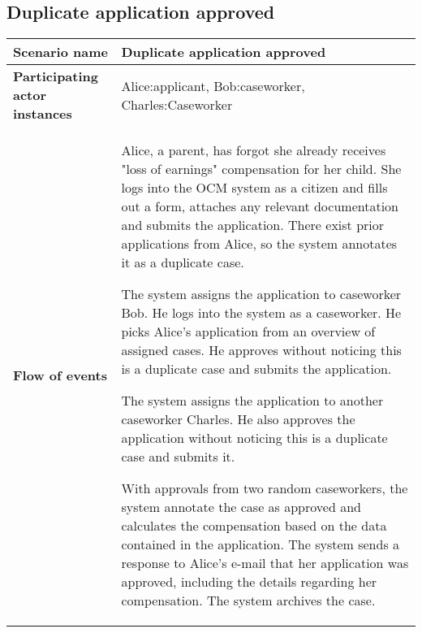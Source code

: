 \subsection*{Duplicate application approved}
\begin{table}[htb!]
\begin{tabularx}{\textwidth}{l|X}
	\textbf{Scenario name} &  Duplicate application approved\\
	\hline
	\textbf{Participating actor instances} & Alice:applicant, Bob:caseworker, Charles:Caseworker\\
	\hline
	\textbf{Flow of events} &
    \begin{compactenum}
	        \item Alice, a parent, has forgot she already receives "loss of earnings" compensation for her child. She logs into the OCM system as a citizen and fills out a form, attaches any relevant documentation and submits the application. There exist prior applications from Alice, so the system annotates it as a duplicate case.
	        \item The system assigns the application to caseworker Bob. He logs into the system as a caseworker. He picks Alice's application from an overview of assigned cases. He approves without noticing this is a duplicate case and submits the application.
	        \item The system assigns the application to another caseworker Charles. He also approves the application without noticing this is a duplicate case and submits it.
	        \item With approvals from two random caseworkers, the system annotate the case as approved and calculates the compensation based on the data contained in the application. The system sends a response to Alice's e-mail that her application was approved, including the details regarding her compensation. The system archives the case.
    \end{compactenum}\\
	\hline
\end{tabularx}
\end{table}
